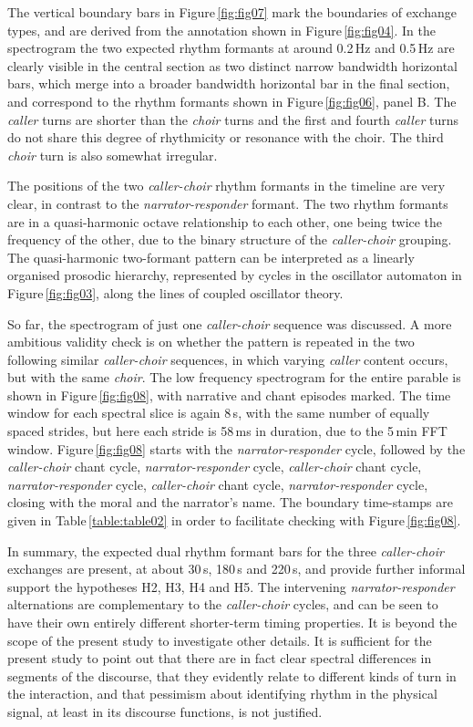 \documentclass[output=paper,colorlinks,citecolor=brown
]{langscibook}
\begin{document}
The vertical boundary bars in Figure\,\ref{fig:fig07} mark the boundaries of exchange types, and are derived from the annotation shown in Figure\,\ref{fig:fig04}. In the spectrogram the two expected rhythm formants at around 0.2\,Hz and 0.5\,Hz are clearly visible in the central section as two distinct narrow bandwidth horizontal bars, which merge into a broader bandwidth horizontal bar in the final section, and correspond to the rhythm formants shown in Figure\,\ref{fig:fig06}, panel B. The \textit{caller} turns are shorter than the \textit{choir} turns and the first and fourth \textit{caller} turns do not share this degree of rhythmicity or resonance with the choir. The third \textit{choir} turn is also somewhat irregular.

The positions of the two \textit{caller-choir} rhythm formants in the timeline are very clear, in contrast to the \textit{narrator-responder} formant. The two rhythm formants are in a quasi-harmonic octave relationship to each other, one being twice the frequency of the other, due to the binary structure of the \textit{caller-choir} grouping. The quasi-harmonic two-formant pattern can be interpreted as a linearly organised prosodic hierarchy, represented by cycles in the oscillator automaton in Figure\,\ref{fig:fig03}, along the lines of coupled oscillator theory.

So far, the spectrogram of just one \textit{caller-choir} sequence was discussed. A more ambitious validity check is on whether the pattern is repeated in the two following similar \textit{caller-choir} sequences, in which varying \textit{caller} content occurs, but with the same \textit{choir}. The low frequency spectrogram for the entire parable is shown in Figure\,\ref{fig:fig08}, with narrative and chant episodes marked. The time window for each spectral slice is again 8\,s, with the same number of equally spaced strides, but here each stride is 58\,ms in duration, due to the 5\,min FFT window. Figure\,\ref{fig:fig08} starts with the \textit{narrator-responder} cycle, followed by the \textit{caller-choir} chant cycle, \textit{narrator-responder} cycle, \textit{caller-choir} chant cycle, \textit{narrator-responder} cycle, \textit{caller-choir} chant cycle, \textit{narrator-responder} cycle, closing with the moral and the narrator's name. The boundary time-stamps are given in Table\,\ref{table:table02} in order to facilitate checking with Figure\,\ref{fig:fig08}.

In summary, the expected dual rhythm formant bars for the three \textit{caller-choir} exchanges are present, at about 30\,s, 180\,s and 220\,s, and provide further informal support the hypotheses H2, H3, H4 and H5. The intervening \textit{narrator-responder} alternations are complementary to the \textit{caller-choir} cycles, and can be seen to have their own entirely different shorter-term timing properties. It is beyond the scope of the present study to investigate other details. It is sufficient for the present study to point out that there are in fact clear spectral differences in segments of the discourse, that they evidently relate to different kinds of turn in the interaction, and that pessimism about identifying rhythm in the physical signal, at least in its discourse functions, is not justified.
\end{document}
